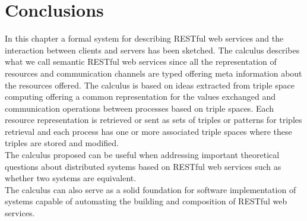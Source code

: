 \section{Conclusions}
In this chapter a formal system for describing RESTful web services and the interaction between clients and servers has been sketched. The calculus describes what we call semantic RESTful web services since all the representation of resources and communication channels are typed offering meta information about the resources offered. The calculus is based on ideas extracted from triple space computing offering a common representation for the values exchanged and communication operations between processes based on triple spaces. Each resource representation is retrieved or sent as sets of triples or patterns for triples retrieval and each process has one or more associated triple spaces where these triples are stored and modified.\\
The calculus proposed can be useful when addressing important theoretical questions about distributed systems based on RESTful web services such as whether two systems are equivalent.\\
The calculus can also serve as a solid foundation for software implementation of systems capable of automating the building and composition of RESTful web services.